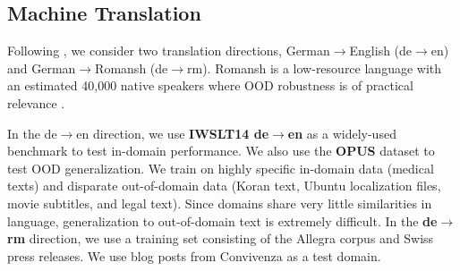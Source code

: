 \subsection{Machine Translation}
Following \citealt{Muller2019DomainRI}, we consider two translation directions, German$\to$English (de$\to$en) and German$\to$Romansh (de$\to$rm). Romansh is a low-resource language with an estimated 40,000 native speakers where OOD robustness is of practical relevance \citep{Muller2019DomainRI}.

In the de$\to$en direction, we use \textbf{IWSLT14 de$\to$en} \citep{cettolo2014proceedings} as a widely-used benchmark to test in-domain performance. 
We also use the \textbf{OPUS} \citep{TIEDEMANN12.463} dataset to test OOD generalization. 
We train on highly specific in-domain data (medical texts) and disparate out-of-domain data (Koran text, Ubuntu localization files, movie subtitles, and legal text).
Since domains share very little similarities in language, generalization to out-of-domain text is extremely difficult.
In the \textbf{de$\to$rm} direction, we use a training set consisting of the Allegra corpus \citep{scherrer-cartoni-2012-trilingual} and Swiss press releases. We use blog posts from Convivenza as a test domain. 